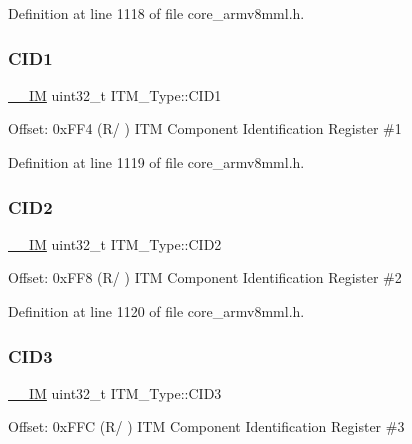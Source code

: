 Definition at line 1118 of file core\+\_\+armv8mml.\+h.

\mbox{\label{struct_i_t_m___type_ac40df2c3a6cef02f90b4e82c8204756f}} 
\subsubsection{\texorpdfstring{C\+I\+D1}{CID1}}
{\footnotesize\ttfamily \hyperlink{core__sc300_8h_a4cc1649793116d7c2d8afce7a4ffce43}{\+\_\+\+\_\+\+IM} uint32\+\_\+t I\+T\+M\+\_\+\+Type\+::\+C\+I\+D1}

Offset\+: 0x\+F\+F4 (R/ ) I\+TM Component Identification Register \#1 

Definition at line 1119 of file core\+\_\+armv8mml.\+h.

\mbox{\label{struct_i_t_m___type_a8000b92e4e528ae7ac4cb8b8d9f6757d}} 
\subsubsection{\texorpdfstring{C\+I\+D2}{CID2}}
{\footnotesize\ttfamily \hyperlink{core__sc300_8h_a4cc1649793116d7c2d8afce7a4ffce43}{\+\_\+\+\_\+\+IM} uint32\+\_\+t I\+T\+M\+\_\+\+Type\+::\+C\+I\+D2}

Offset\+: 0x\+F\+F8 (R/ ) I\+TM Component Identification Register \#2 

Definition at line 1120 of file core\+\_\+armv8mml.\+h.

\mbox{\label{struct_i_t_m___type_a43451f43f514108d9eaed5b017f8d921}} 
\subsubsection{\texorpdfstring{C\+I\+D3}{CID3}}
{\footnotesize\ttfamily \hyperlink{core__sc300_8h_a4cc1649793116d7c2d8afce7a4ffce43}{\+\_\+\+\_\+\+IM} uint32\+\_\+t I\+T\+M\+\_\+\+Type\+::\+C\+I\+D3}

Offset\+: 0x\+F\+FC (R/ ) I\+TM Component Identification Register \#3 

